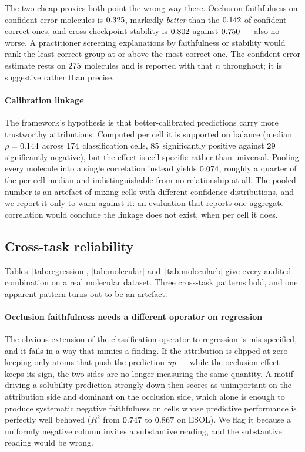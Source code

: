 The two cheap proxies both point the wrong way there. Occlusion faithfulness on
confident-error molecules is $0.325{}$, markedly \emph{better} than the
$0.142{}$ of confident-correct ones, and cross-checkpoint stability is
$0.802{}$ against $0.750{}$ --- also no worse. A practitioner
screening explanations by faithfulness or stability would rank the least
correct group at or above the most correct one. The confident-error estimate
rests on $275{}$ molecules and is reported with that $n$ throughout; it
is suggestive rather than precise.

\paragraph{Calibration linkage} The framework's hypothesis is that
better-calibrated predictions carry more trustworthy attributions. Computed per
cell it is supported on balance (median $\rho=0.144{}$ across
$174{}$ classification cells, $85{}$ significantly positive
against $29{}$ significantly negative), but the effect is
cell-specific rather than universal. Pooling every molecule into a single
correlation instead yields $0.074{}$, roughly a quarter of the
per-cell median and indistinguishable from no relationship at all. The pooled
number is an artefact of mixing cells with different confidence distributions,
and we report it only to warn against it: an evaluation that reports one
aggregate correlation would conclude the linkage does not exist, when per cell
it does.

\subsection{Cross-task reliability}
\label{sec:crosstask}

Tables~\ref{tab:regression}, \ref{tab:molecular} and~\ref{tab:molecularb} give
every audited combination on a real molecular dataset. Three cross-task
patterns hold, and one apparent pattern turns out to be an artefact.

\paragraph{Occlusion faithfulness needs a different operator on regression}
The obvious extension of the classification operator to regression is
mis-specified, and it fails in a way that mimics a finding. If the attribution
is clipped at zero --- keeping only atoms that push the prediction \emph{up}
--- while the occlusion effect keeps its sign, the two sides are no longer
measuring the same quantity. A motif driving a solubility prediction strongly
down then scores as unimportant on the attribution side and dominant on the
occlusion side, which alone is enough to produce systematic negative
faithfulness on cells whose predictive performance is perfectly well behaved
($R^2$ from $0.747{}$ to $0.867{}$ on ESOL). We flag it because
a uniformly negative column invites a substantive reading, and the substantive
reading would be wrong.

